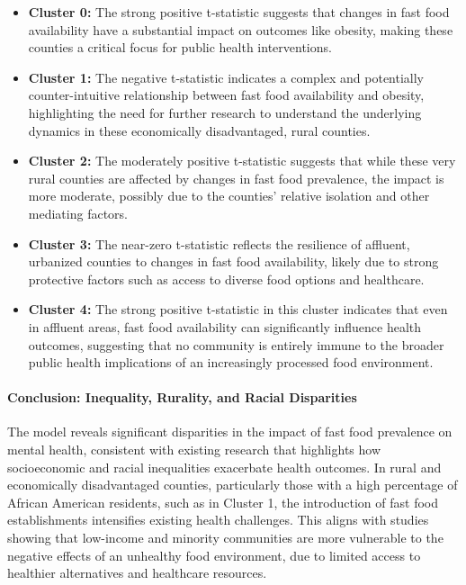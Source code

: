 \documentclass[letterpaper, 11pt]{report}
\begin{document}
\begin{itemize}
    \item \textbf{Cluster 0:} The strong positive t-statistic suggests that changes in fast food availability have a substantial impact on outcomes like obesity, making these counties a critical focus for public health interventions.
    \item \textbf{Cluster 1:} The negative t-statistic indicates a complex and potentially counter-intuitive relationship between fast food availability and obesity, highlighting the need for further research to understand the underlying dynamics in these economically disadvantaged, rural counties.
    \item \textbf{Cluster 2:} The moderately positive t-statistic suggests that while these very rural counties are affected by changes in fast food prevalence, the impact is more moderate, possibly due to the counties' relative isolation and other mediating factors.
    \item \textbf{Cluster 3:} The near-zero t-statistic reflects the resilience of affluent, urbanized counties to changes in fast food availability, likely due to strong protective factors such as access to diverse food options and healthcare.
    \item \textbf{Cluster 4:} The strong positive t-statistic in this cluster indicates that even in affluent areas, fast food availability can significantly influence health outcomes, suggesting that no community is entirely immune to the broader public health implications of an increasingly processed food environment.
\end{itemize}

\paragraph{Conclusion: Inequality, Rurality, and Racial Disparities}

The model reveals significant disparities in the impact of fast food prevalence on mental health, consistent with existing research that highlights how socioeconomic and racial inequalities exacerbate health outcomes. In rural and economically disadvantaged counties, particularly those with a high percentage of African American residents, such as in Cluster 1, the introduction of fast food establishments intensifies existing health challenges. This aligns with studies showing that low-income and minority communities are more vulnerable to the negative effects of an unhealthy food environment, due to limited access to healthier alternatives and healthcare resources.
\end{document}
